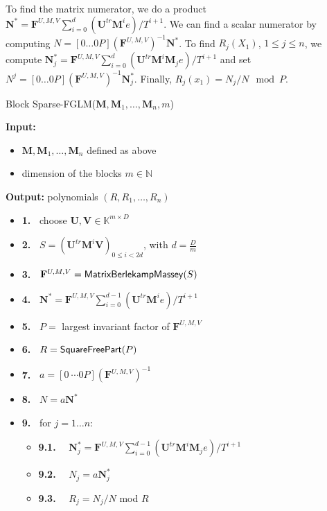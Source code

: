 \documentclass[12pt]{article}
\def\mF{\mathbf{F}}
\def\mM{\mathbf{M}}
\def\mN{\mathbf{N}}
\def\mU{\mathbf{U}}
\def\mV{\mathbf{V}}
\begin{document}
To find the matrix numerator, we do a product 
$\mN^* = \mF^{U,M,V}\sum_{i=0}^{d} (\mU^{tr} \mM^i e)/ T^{i+1}$. We can find a
scalar numerator by computing $N =  [0 \dots 0 P] (\mF^{U,M,V})^{-1} \mN^*$. 
To find $R_j(X_1)$, $1 \le j \le n$, we compute 
$\mN^*_j = \mF^{U,M,V} \sum_{i=0}^{d} (\mU^{tr} \mM^i \mM_j e) / {T^{i+1}}$
and set $N^j =
[0 \dots 0 P] (\mF^{U,M,V})^{-1} \mN^*_j$. Finally, $R_j(x_1) = N_j / N \mod P$.

\begin{algorithm}[H]
	\label{algo:block-sparse-fglm}
	\caption{Block Sparse-FGLM($\mM,\mM_1,\dots,\mM_n,m$)}
	{\bf Input:} \vspace{-0.5em}
	\begin{itemize}
		\item $\mM,\mM_1,\dots,\mM_n$ defined as above
		\item dimension of the blocks $m \in \mathbb{N}$
	\end{itemize}
	{\bf Output:} polynomials $(R,R_1,\dots,R_n)$
	\begin{itemize}\setlength\itemsep{0em}
		\item[]{\bf 1.~} {\sf choose $\mU,\mV \in \mathbb{K}^{m \times D}$}
		\item[]{\bf 2.~} {\sf $S= (\mU^{tr}\mM^i\mV)_{0 \le i < 2d}$, with $d = \frac{D}{m}$}
		\item[]{\bf 3.~} {\sf $\mF^{U,M,V} = {\sf MatrixBerlekampMassey}(S)$}
		\item[]{\bf 4.~} {\sf $\mN^* = \mF^{U,M,V}\sum_{i=0}^{d-1} {(\mU^{tr}\mM^ie)}/{T^{i+1}}$} 	 
		\item[]{\bf 5.~} {\sf $P=$ largest invariant factor of $\mF^{U,M,V}$}
		\item[]{\bf 6.~} {\sf $R={\sf SquareFreePart}(P)$} 
		\item[]{\bf 7.~} {\sf $a = [0 ~\cdots 0 P] (\mF^{U,M,V})^{-1}$}
		\item[]{\bf 8.~} {\sf $N=a\mN^*$}
		\item[]{\bf 9.~} {\sf for $j = 1 \dots n$:}
		\begin{itemize}
			\item[]{\bf 9.1.} ~~{\sf	$\mN_j^* = \mF^{U,M,V}
				\sum_{i= 0}^{d-1} {(\mU^{tr}\mM^i \mM_j e)}/{T^{i+1}}$}
			\item[]{\bf 9.2.} ~~{\sf $N_j=a\mN_j^*$}
			\item[]{\bf 9.3.} ~~{\sf $R_j=N_j/N$ mod $R$}
		\end{itemize}
	\end{itemize}
\end{algorithm}
\end{document}
